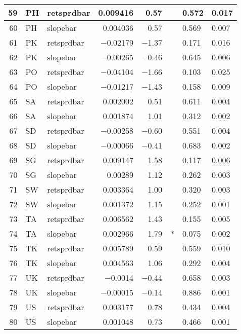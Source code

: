 \begin{longtable}{|r|l|l|r|r|l|l|l|}
   59 &    PH &    retsprdbar &    0.009416 &    0.57 &      &    0.572 &    0.017\\\hline
   60 &    PH &    slopebar &    0.004036 &    0.57 &      &    0.569 &    0.007\\\hline
   61 &    PK &    retsprdbar &    $-$0.02179 &    $-$1.37 &      &    0.171 &    0.016\\\hline
   62 &    PK &    slopebar &    $-$0.00265 &    $-$0.46 &      &    0.645 &    0.006\\\hline
   63 &    PO &    retsprdbar &    $-$0.04104 &    $-$1.66 &      &    0.103 &    0.025\\\hline
   64 &    PO &    slopebar &    $-$0.01217 &    $-$1.43 &      &    0.158 &    0.009\\\hline
   65 &    SA &    retsprdbar &    0.002002 &    0.51 &      &    0.611 &    0.004\\\hline
   66 &    SA &    slopebar &    0.001874 &    1.01 &      &    0.312 &    0.002\\\hline
   67 &    SD &    retsprdbar &    $-$0.00258 &    $-$0.60 &      &    0.551 &    0.004\\\hline
   68 &    SD &    slopebar &    $-$0.00066 &    $-$0.41 &      &    0.683 &    0.002\\\hline
   69 &    SG &    retsprdbar &    0.009147 &    1.58 &      &    0.117 &    0.006\\\hline
   70 &    SG &    slopebar &    0.00289 &    1.12 &      &    0.262 &    0.003\\\hline
   71 &    SW &    retsprdbar &    0.003364 &    1.00 &      &    0.320 &    0.003\\\hline
   72 &    SW &    slopebar &    0.001372 &    1.15 &      &    0.252 &    0.001\\\hline
   73 &    TA &    retsprdbar &    0.006562 &    1.43 &      &    0.155 &    0.005\\\hline
   74 &    TA &    slopebar &    0.002966 &    1.79 &    * &    0.075 &    0.002\\\hline
   75 &    TK &    retsprdbar &    0.005789 &    0.59 &      &    0.559 &    0.010\\\hline
   76 &    TK &    slopebar &    0.004563 &    1.06 &      &    0.292 &    0.004\\\hline
   77 &    UK &    retsprdbar &    $-$0.0014 &    $-$0.44 &      &    0.658 &    0.003\\\hline
   78 &    UK &    slopebar &    $-$0.00015 &    $-$0.14 &      &    0.886 &    0.001\\\hline
   79 &    US &    retsprdbar &    0.003177 &    0.78 &      &    0.434 &    0.004\\\hline
   80 &    US &    slopebar &    0.001048 &    0.73 &      &    0.466 &    0.001\\\hline
\end{longtable}

